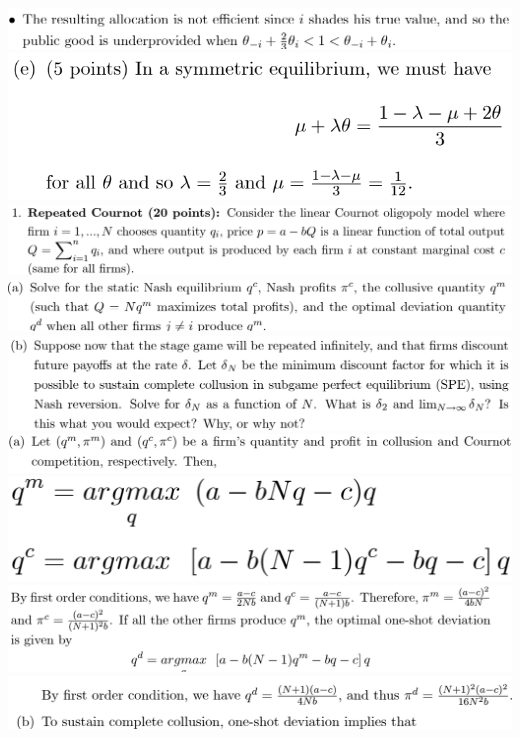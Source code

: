 \documentclass[8pt,landscape]{extarticle}
\begin{document}
\begin{multicols*}{3}
    \includegraphics[width=0.68\linewidth,keepaspectratio]{Screenshots/Screenshot 2024-03-11 135210.png}
    \includegraphics[width=0.5\linewidth,keepaspectratio]{Screenshots/Screenshot 2024-03-11 135215.png}
    \includegraphics[width=0.78\linewidth,keepaspectratio]{Screenshots/Screenshot 2024-03-11 170321.png}
    \includegraphics[width=0.74\linewidth,keepaspectratio]{Screenshots/Screenshot 2024-03-11 170326.png}
    \includegraphics[width=0.74\linewidth,keepaspectratio]{Screenshots/Screenshot 2024-03-11 170335.png}
    \includegraphics[width=0.73\linewidth,keepaspectratio]{Screenshots/Screenshot 2024-03-11 170342.png}
    \includegraphics[width=0.34\linewidth,keepaspectratio]{Screenshots/Screenshot 2024-03-11 170348.png}
    \includegraphics[width=0.73\linewidth,keepaspectratio]{Screenshots/Screenshot 2024-03-11 170356.png}
    \includegraphics[width=0.69\linewidth,keepaspectratio]{Screenshots/Screenshot 2024-03-11 170405.png}

\end{multicols*}
\end{document}
